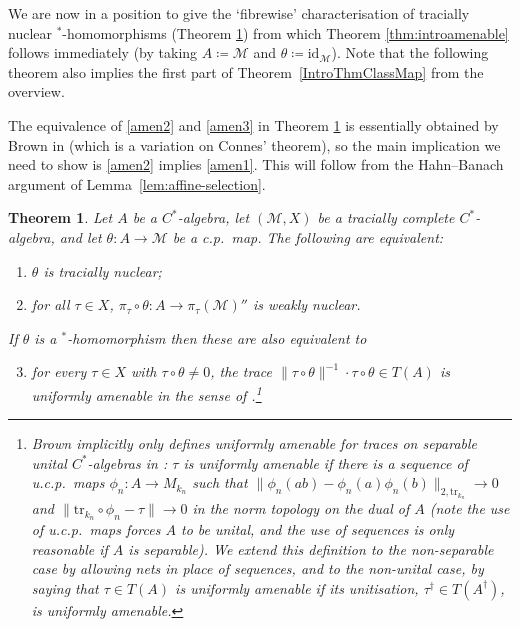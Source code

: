 \documentclass[a4paper,11pt]{amsart}
\newtheorem{theorem}{Theorem}
\theoremstyle{definition}
\numberwithin{equation}{section}
\numberwithin{theorem}{section}
\newcommand{\id}{\mathrm{id}}
\newcommand{\M}{\mathcal{M}}
\begin{document}
We are now in a position to give the `fibrewise' characterisation of tracially nuclear $^*$-homomorphisms (Theorem \ref{thm:amenable}) from which Theorem \ref{thm:introamenable} follows immediately (by taking $A\coloneqq \mathcal M$ and $\theta\coloneqq \id_{\mathcal M}$).  Note that the following theorem also implies the first part of Theorem~\ref{IntroThmClassMap} from the overview.

The equivalence of \ref{amen2} and \ref{amen3} in Theorem \ref{thm:amenable} is essentially obtained by Brown in \cite[Theorem 3.2.2]{Bro06} (which is a variation on Connes' theorem), so the main implication we need to show is \ref{amen2} implies \ref{amen1}.  This will follow from the Hahn--Banach argument of Lemma~\ref{lem:affine-selection}.

\begin{theorem}\label{thm:amenable}
   Let $A$ be a $C^*$-algebra, let $(\M, X)$ be a tracially complete $C^*$-algebra, and let $\theta \colon A \rightarrow \mathcal M$ be a c.p.\ map.   The following are equivalent:
\begin{enumerate}
	\item\label{amen1} $\theta$ is tracially nuclear;
	\item\label{amen2} for all $\tau \in X$, $\pi_\tau \circ \theta \colon A \rightarrow \pi_\tau(\M)''$ is weakly nuclear.
 \end{enumerate}
 If $\theta$ is a $^*$-homomorphism then these are also equivalent to
 \begin{enumerate}
 \setcounter{enumi}{2}
	\item\label{amen3} for every $\tau \in X$ with $\tau \circ \theta \neq 0$, the trace $\| \tau \circ \theta\|^{-1} \cdot \tau \circ \theta \in T(A)$ is uniformly amenable in the sense of \cite[Definition~3.2.1]{Bro06}.\footnote{Brown implicitly only defines uniformly amenable for traces on separable unital $C^*$-algebras in \cite[Definition 3.2.1]{Br08}: $\tau$ is uniformly amenable if there is a sequence of u.c.p.\ maps $\phi_n\colon A \to M_{k_n}$ such that $\|\phi_n(ab)-\phi_n(a)\phi_n(b)\|_{2,\mathrm{tr}_{k_n}} \to 0$ and $\|\mathrm{tr}_{k_n}\circ \phi_n-\tau\| \to 0$ in the norm topology on the dual of $A$ (note the use of u.c.p.\ maps forces $A$ to be unital, and the use of sequences is only reasonable if $A$ is separable). We extend this definition to the non-separable case by allowing nets in place of sequences, and to the non-unital case, by saying that $\tau \in T(A)$ is uniformly amenable if its unitisation, $\tau^\dag \in T(A^\dag)$, is uniformly amenable.}
\end{enumerate}
\end{theorem}
\end{document}
